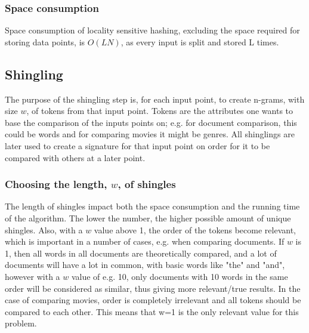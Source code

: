 \subsubsection{Space consumption}
Space consumption of locality sensitive hashing, excluding the space required for storing data points, is \(O(LN)\), as every input is split and stored L times.

\subsection{Shingling}
The purpose of the shingling step is, for each input point, to create n-grams, with size \(w\), of tokens from that input point. Tokens are the attributes one wants to base the comparison of the inputs points on; e.g. for document comparison, this could be words and for comparing movies it might be genres. All shinglings are later used to create a signature for that input point on order for it to be compared with others at a later point. 
\subsubsection{Choosing the length, \(w\), of shingles}
The length of shingles impact both the space consumption and the running time of the algorithm. The lower the number, the higher possible amount of unique shingles. Also, with a \(w\) value above 1, the order of the tokens become relevant, which is important in a number of cases, e.g. when comparing documents. If \(w\) is 1, then all words in all documents are theoretically compared, and a lot of documents will have a lot in common, with basic words like "the" and "and", however with a \(w\) value of e.g. 10, only documents with 10 words in the same order will be considered as similar, thus giving more relevant/true results. In the case of comparing movies, order is completely irrelevant and all tokens should be compared to each other. This means that w=1 is the only relevant value for this problem.

